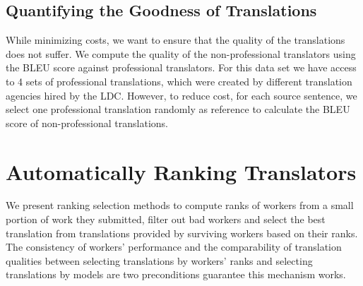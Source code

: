\documentclass[11pt]{article}
\begin{document}
 \subsection{Quantifying the Goodness of Translations}
While minimizing costs, we want to ensure that the quality of the translations does not suffer.  We compute the quality of the non-professional translators using the BLEU score \cite{papineni2002bleu} against professional translators.  For this data set we have access to 4 sets of professional translations, which were created by different translation agencies hired by the LDC. However, to reduce cost, for each source sentence, we select one professional translation  randomly as reference to calculate the BLEU score of non-professional translations.   

\section{Automatically Ranking Translators}

We present ranking selection methods to compute ranks of workers from a small portion of work they submitted, filter out bad workers and select the best translation from translations provided by  surviving workers based on their ranks. The consistency of workers' performance and the comparability of translation qualities between selecting translations by workers' ranks and selecting translations by models  are two preconditions guarantee this mechanism works.
\end{document}
